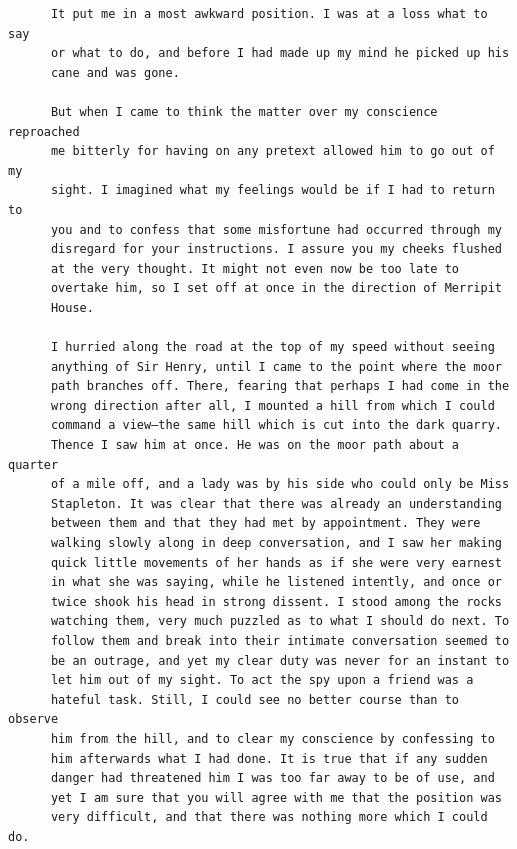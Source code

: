 \documentclass{article}
\begin{document}
\begin{verbatim}
      It put me in a most awkward position. I was at a loss what to say
      or what to do, and before I had made up my mind he picked up his
      cane and was gone.

      But when I came to think the matter over my conscience reproached
      me bitterly for having on any pretext allowed him to go out of my
      sight. I imagined what my feelings would be if I had to return to
      you and to confess that some misfortune had occurred through my
      disregard for your instructions. I assure you my cheeks flushed
      at the very thought. It might not even now be too late to
      overtake him, so I set off at once in the direction of Merripit
      House.

      I hurried along the road at the top of my speed without seeing
      anything of Sir Henry, until I came to the point where the moor
      path branches off. There, fearing that perhaps I had come in the
      wrong direction after all, I mounted a hill from which I could
      command a view—the same hill which is cut into the dark quarry.
      Thence I saw him at once. He was on the moor path about a quarter
      of a mile off, and a lady was by his side who could only be Miss
      Stapleton. It was clear that there was already an understanding
      between them and that they had met by appointment. They were
      walking slowly along in deep conversation, and I saw her making
      quick little movements of her hands as if she were very earnest
      in what she was saying, while he listened intently, and once or
      twice shook his head in strong dissent. I stood among the rocks
      watching them, very much puzzled as to what I should do next. To
      follow them and break into their intimate conversation seemed to
      be an outrage, and yet my clear duty was never for an instant to
      let him out of my sight. To act the spy upon a friend was a
      hateful task. Still, I could see no better course than to observe
      him from the hill, and to clear my conscience by confessing to
      him afterwards what I had done. It is true that if any sudden
      danger had threatened him I was too far away to be of use, and
      yet I am sure that you will agree with me that the position was
      very difficult, and that there was nothing more which I could do.


\end{verbatim}
\end{document}
